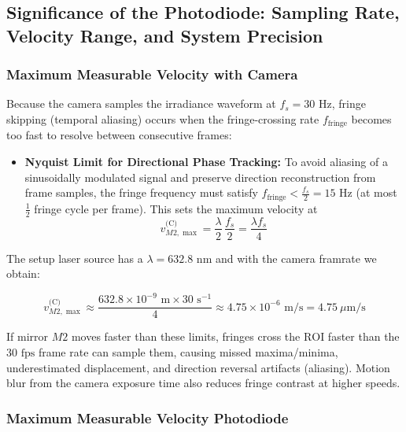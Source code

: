 \subsection{Significance of the Photodiode: Sampling Rate, Velocity Range, and System Precision}
\label{sec:importance_bpw34_precision}

\subsubsection{Maximum Measurable Velocity with Camera}
\label{sec:camera_velocity}
Because the camera samples the irradiance waveform at $f_s = 30\text{ Hz}$, fringe skipping (temporal aliasing) occurs when the fringe-crossing rate $f_{\text{fringe}}$ becomes too fast to resolve between consecutive frames:
\begin{itemize}
    \item \textbf{Nyquist Limit for Directional Phase Tracking:} To avoid aliasing of a sinusoidally modulated signal and preserve direction reconstruction from frame samples, the fringe frequency must satisfy $f_{\text{fringe}} < \frac{f_s}{2} = 15\text{ Hz}$ (at most $\frac{1}{2}$ fringe cycle per frame). This sets the maximum velocity at
    \begin{equation}
        v_{M2, \max}^{\text{(C)}} = \frac{\lambda}{2}\,\frac{f_s}{2} = \frac{\lambda f_s}{4}
        \label{eq:vmax_nyquist}
    \end{equation}
\end{itemize}

The setup laser source has a  $\lambda = 632.8\text{ nm}$ and with the camera framrate we obtain:

\begin{equation}
    v_{M2, \max}^{\text{(C)}} \approx \frac{632.8 \times 10^{-9}\text{ m} \times 30\text{ s}^{-1}}{4} \approx 4.75 \times 10^{-6}\text{ m/s} = 4.75\ \mu\text{m/s}
\end{equation}


If mirror $M2$ moves faster than these limits, fringes cross the $\text{ROI}$ faster than the $30\text{ fps}$ frame rate can sample them, causing missed maxima/minima, underestimated displacement, and direction reversal artifacts (aliasing). Motion blur from the camera exposure time also reduces fringe contrast at higher speeds.

\subsubsection{Maximum Measurable Velocity Photodiode}
\label{sec:vmax_bpw34_fpga}

